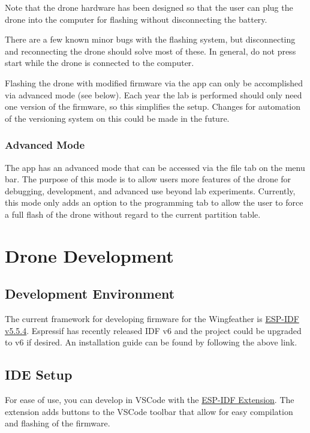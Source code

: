 \documentclass[12pt, titlepage]{article}
\begin{document}
Note that the drone hardware has been designed so that the user can plug the drone into the computer for flashing without disconnecting the battery. 

There are a few known minor bugs with the flashing system, but disconnecting and reconnecting the drone should solve most of these. In general, do not press start while the drone is connected to the computer.

Flashing the drone with modified firmware via the app can only be accomplished via advanced mode (see below). Each year the lab is performed should only need one version of the firmware, so this simplifies the setup. Changes for automation of the versioning system on this could be made in the future.

\subsubsection{Advanced Mode}
The app has an advanced mode that can be accessed via the file tab on the menu bar. The purpose of this mode is to allow users more features of the drone for debugging, development, and advanced use beyond lab experiments. Currently, this mode only adds an option to the programming tab to allow the user to force a full flash of the drone without regard to the current partition table. 

\section{Drone Development}

\subsection{Development Environment}
The current framework for developing firmware for the Wingfeather is \href{https://docs.espressif.com/projects/esp-idf/en/v5.5.4/esp32/get-started/index.html}{ESP-IDF v5.5.4}. Espressif has recently released IDF v6 and the project could be upgraded to v6 if desired. An installation guide can be found by following the above link.

\subsection{IDE Setup}
For ease of use, you can develop in VSCode with the \href{https://github.com/espressif/vscode-esp-idf-extension/blob/master/README.md}{ESP-IDF Extension}. 
The extension adds buttons to the VSCode toolbar that allow for easy compilation and flashing of the firmware.
\end{document}
